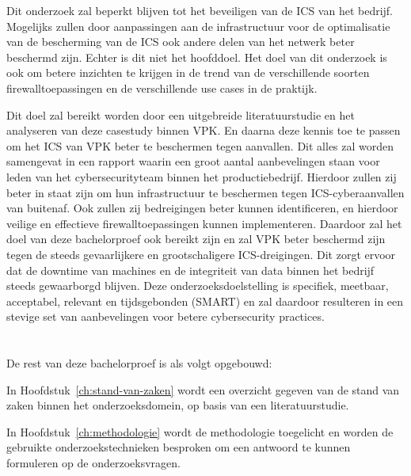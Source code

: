 Dit onderzoek zal beperkt blijven tot het beveiligen van de ICS van het bedrijf. Mogelijks zullen door aanpassingen aan de infrastructuur voor de optimalisatie van de bescherming van de ICS ook andere delen van het netwerk beter beschermd zijn. Echter is dit niet het hoofddoel. Het doel van dit onderzoek is ook om betere inzichten te krijgen in de trend van de verschillende soorten firewalltoepassingen en de verschillende use cases in de praktijk. 
\vspace{5mm}

Dit doel zal bereikt worden door een uitgebreide literatuurstudie en het analyseren van deze casestudy binnen VPK. En daarna deze kennis toe te passen om het ICS van VPK beter te beschermen tegen aanvallen. Dit alles zal worden samengevat in een rapport waarin een groot aantal aanbevelingen staan voor leden van het cybersecurityteam binnen het productiebedrijf. Hierdoor zullen zij beter in staat zijn om hun infrastructuur te beschermen tegen ICS-cyberaanvallen van buitenaf. Ook zullen zij bedreigingen beter kunnen identificeren, en hierdoor veilige en effectieve firewalltoepassingen kunnen implementeren. Daardoor zal het doel van deze bachelorproef ook bereikt zijn en zal VPK beter beschermd zijn tegen de steeds gevaarlijkere en grootschaligere ICS-dreigingen. Dit zorgt ervoor dat de downtime van machines en de integriteit van data binnen het bedrijf steeds gewaarborgd blijven. Deze onderzoeksdoelstelling is specifiek, meetbaar, acceptabel, relevant en tijdsgebonden (SMART) en zal daardoor resulteren in een stevige set van aanbevelingen voor betere cybersecurity practices.

\section{}%
\label{sec:opzet-bachelorproef}


De rest van deze bachelorproef is als volgt opgebouwd:

In Hoofdstuk~\ref{ch:stand-van-zaken} wordt een overzicht gegeven van de stand van zaken binnen het onderzoeksdomein, op basis van een literatuurstudie.

In Hoofdstuk~\ref{ch:methodologie} wordt de methodologie toegelicht en worden de gebruikte onderzoekstechnieken besproken om een antwoord te kunnen formuleren op de onderzoeksvragen.

